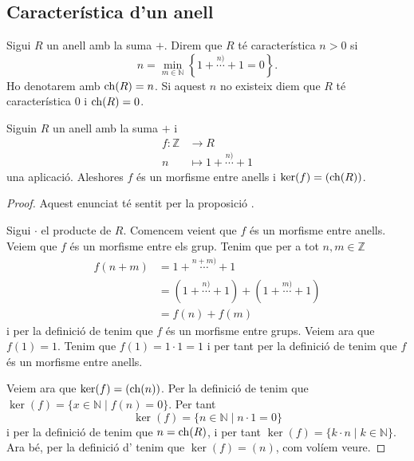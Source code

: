 \documentclass[../Apunts.tex]{subfiles}
\begin{document}
	\subsection{Característica d'un anell}
	\begin{definition}[Característica]
		\label{def:característica d'un anell}
		Sigui \(R\) un anell amb la suma \(+\). Direm que \(R\) té característica \(n>0\) si \[n=\min_{m\in\mathbb{N}}\left\{1+\overset{n)}{\cdots}+1=0\right\}.\]
		Ho denotarem amb \(\operatorname{ch}(R)=n\). Si aquest \(n\) no existeix diem que \(R\) té característica \(0\) i \(\operatorname{ch}(R)=0\).
	\end{definition}
	\begin{proposition}
		\label{prop:morfisme entre anells per trobar característica}
		Siguin \(R\) un anell amb la suma \(+\) i
		\begin{align*}
		f\colon\mathbb{Z}&\longrightarrow R\\
		n&\longmapsto 1+\overset{n)}{\cdots}+1
		\end{align*}
		una aplicació. Aleshores \(f\) és un morfisme entre anells i \(\operatorname{ker}(f)=(\operatorname{ch}(R))\).
		\begin{proof}
			Aquest enunciat té sentit per la proposició . %
			
			Sigui \(\cdot\) el producte de \(R\). Comencem veient que \(f\) és un morfisme entre anells. Veiem que \(f\) és un morfisme entre els grup. Tenim que per a tot \(n,m\in\mathbb{Z}\)
			\begin{align*}
				f(n+m)&=1+\overset{n+m)}{\cdots}+1\\
				&=(1+\overset{n)}{\cdots}+1)+(1+\overset{m)}{\cdots}+1)\\
				&=f(n)+f(m)
			\end{align*}
			i per la definició de  tenim que \(f\) és un morfisme entre grups. Veiem ara que \(f(1)=1\). Tenim que \(f(1)=1\cdot1=1\) i per tant per la definició de  tenim que \(f\) és un morfisme entre anells.
			
			Veiem ara que \(\operatorname{ker}(f)=(\operatorname{ch}(n))\). Per la definició de  tenim que \(\ker(f)=\{x\in\mathbb{N}\mid f(n)=0\}\).	Per tant
			\[\ker(f)=\{n\in\mathbb{N}\mid n\cdot1=0\}\]
			i per la definició de  tenim que \(n=\operatorname{ch}(R)\), i per tant \(\ker(f)=\{k\cdot n\mid k\in\mathbb{N}\}\). Ara bé, per la definició d' tenim que \(\ker(f)=(n)\), com volíem veure.
		\end{proof}
	\end{proposition}
\end{document}

